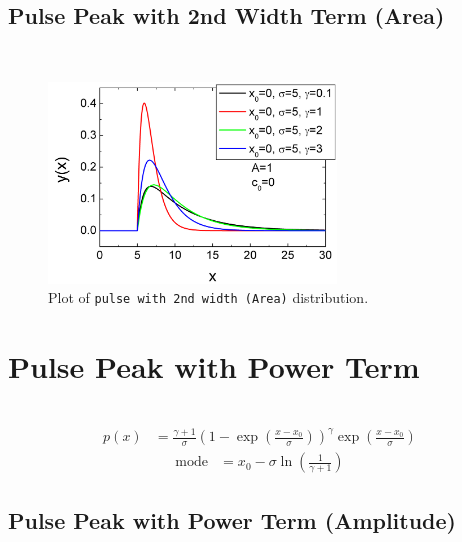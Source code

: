 \clearpage
\subsection{Pulse Peak with 2nd Width Term (Area)} ~\\
\label{sec:pulsewith2ndwidthArea}

\begin{figure}[htb]
\begin{center}
\includegraphics[width=0.6824\textwidth]{Pulse2ndWidthArea.png}
\end{center}
\caption{Plot of \texttt{pulse with 2nd width (Area)} distribution.}
\label{fig:Pulse2ndWidthArea}
\end{figure}

\clearpage
\section{Pulse Peak with Power Term} ~\\
\label{sec:pulsewithpowerterm}
\begin{align}
p(x) &= \frac{\gamma+1}{\sigma} \left(1-\exp\left(\frac{x-x_0}{\sigma}\right)\right)^\gamma \exp\left(\frac{x-x_0}{\sigma}\right)
\end{align}
\begin{align}
\mbox{mode} &= x_0 - \sigma \ln\left(\frac{1}{\gamma+1}\right)
\end{align}

\subsection{Pulse Peak with Power Term (Amplitude)} ~\\
\label{sec:pulsewithpowertermAmplitude}

